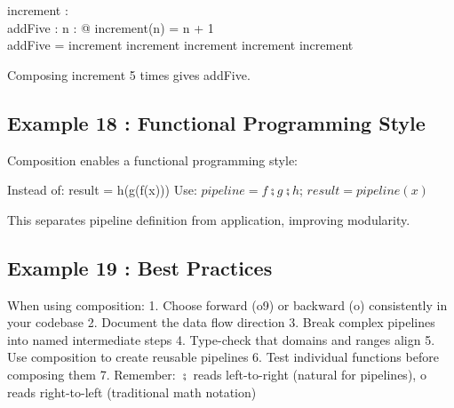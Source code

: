 \documentclass[a4paper,10pt,fleqn]{article}
\begin{document}
\begin{axdef}
increment : \nat \fun \nat \\
addFive : \nat \fun \nat
\where
\forall n : \nat @ increment(n) = n + 1 \\
addFive = increment \comp increment \comp increment \comp increment \comp increment
\end{axdef}

\noindent Composing increment 5 times gives addFive.

\bigskip

\subsection*{Example 18 : Functional Programming Style}

\noindent Composition enables a functional programming style:

\bigskip

\noindent Instead of: result = h(g(f(x))) Use: $pipeline = f \semi g \semi h$; $result = pipeline(x)$

\bigskip

\noindent This separates pipeline definition from application, improving modularity.

\bigskip

\subsection*{Example 19 : Best Practices}

\noindent When using composition: 1. Choose forward (o9) or backward (o) consistently in your codebase 2. Document the data flow direction 3. Break complex pipelines into named intermediate steps 4. Type-check that domains and ranges align 5. Use composition to create reusable pipelines 6. Test individual functions before composing them 7. Remember: $\semi$ reads left-to-right (natural for pipelines), o reads right-to-left (traditional math notation)

\bigskip
\end{document}
